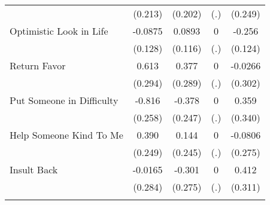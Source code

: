 {\begin{tabular}{l*{4}{c}}
            &     (0.213)         &     (0.202)         &         (.)         &     (0.249)         \\
[1em]
Optimistic Look in Life&     -0.0875         &      0.0893         &           0         &      -0.256\sym{*}  \\
            &     (0.128)         &     (0.116)         &         (.)         &     (0.124)         \\
[1em]
Return Favor&       0.613\sym{*}  &       0.377         &           0         &     -0.0266         \\
            &     (0.294)         &     (0.289)         &         (.)         &     (0.302)         \\
[1em]
Put Someone in Difficulty&      -0.816\sym{**} &      -0.378         &           0         &       0.359         \\
            &     (0.258)         &     (0.247)         &         (.)         &     (0.340)         \\
[1em]
Help Someone Kind To Me&       0.390         &       0.144         &           0         &     -0.0806         \\
            &     (0.249)         &     (0.245)         &         (.)         &     (0.275)         \\
[1em]
Insult Back &     -0.0165         &      -0.301         &           0         &       0.412         \\
            &     (0.284)         &     (0.275)         &         (.)         &     (0.311)         \\
\hline\hline
{}\\
\end{tabular}
}
